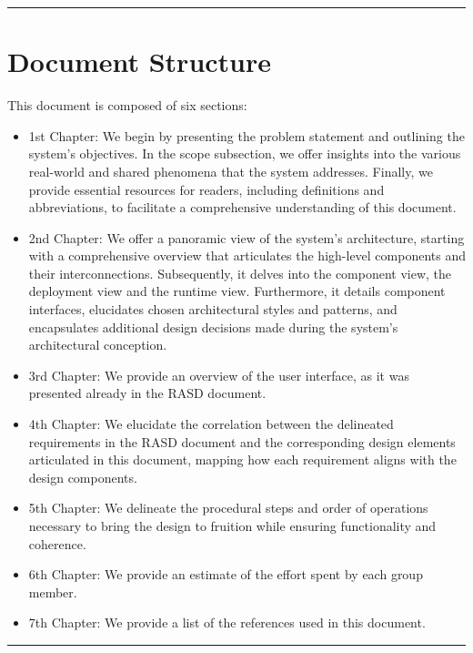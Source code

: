 \documentclass{Configuration_Files/Template}
\begin{document}
{\color{bluepoli}\rule{\linewidth}{0.1pt}}

\section{Document Structure}

This document is composed of six sections:

\begin{itemize}
\item \textcolor{bluepoli}{1st Chapter:} We begin by presenting the problem statement and outlining the system's objectives. In the scope subsection, we offer insights into the various real-world and shared phenomena that the system addresses. Finally, we provide essential resources for readers, including definitions and abbreviations, to facilitate a comprehensive understanding of this document.
\item \textcolor{bluepoli}{2nd Chapter:} We offer a panoramic view of the system's architecture, starting with a comprehensive overview that articulates the high-level components and their interconnections. Subsequently, it delves into the component view, the deployment view and the runtime view. Furthermore, it details component interfaces, elucidates chosen architectural styles and patterns, and encapsulates additional design decisions made during the system's architectural conception.
\item \textcolor{bluepoli}{3rd Chapter:} We provide an overview of the user interface, as it was presented already in the RASD document.
\item \textcolor{bluepoli}{4th Chapter:} We elucidate the correlation between the delineated requirements in the RASD document and the corresponding design elements articulated in this document, mapping how each requirement aligns with the design components.
\item \textcolor{bluepoli}{5th Chapter:} We delineate the procedural steps and order of operations necessary to bring the design to fruition while ensuring functionality and coherence.
\item \textcolor{bluepoli}{6th Chapter:} We provide an estimate of the effort spent by each group member.
\item \textcolor{bluepoli}{7th Chapter:} We provide a list of the references used in this document.
\end{itemize}

{\color{bluepoli}\rule{\linewidth}{0.1pt}}

\end{document}
